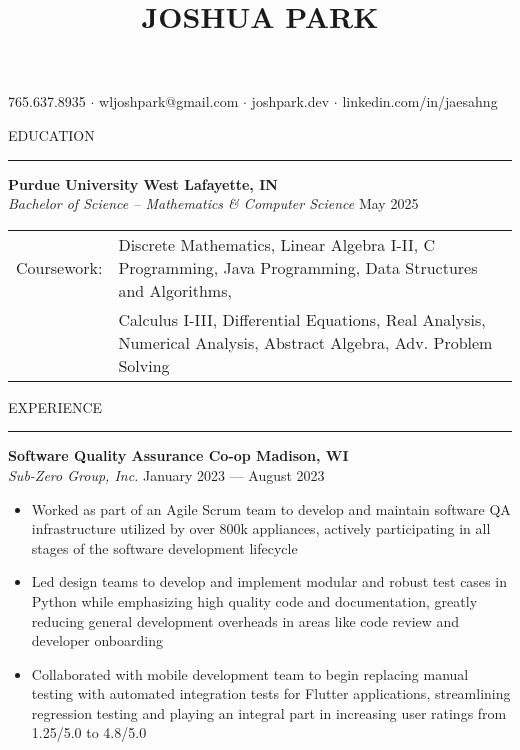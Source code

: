 \documentclass[letter,11pt]{article}
\begin{document}
\title{\Huge{JOSHUA PARK}}
\date{}
\maketitle
\vspace*{-6em}

\begin{center}\begin{small}
    765.637.8935 $\cdot$ wljoshpark@gmail.com $\cdot$ joshpark.dev $\cdot$ linkedin.com/in/jaesahng
\end{small}\end{center}

EDUCATION

\vspace*{-1.25em}
\rule{\textwidth}{1.2pt}
\textbf{Purdue University \hfill West Lafayette, IN}\\
\emph{Bachelor of Science -- Mathematics \& Computer Science} \hfill May 2025 \\
\begin{tabular}{@{}p{1.83cm}l}
    Coursework: & Discrete Mathematics, Linear Algebra I-II, C Programming, Java Programming, Data Structures and Algorithms,\\
    &Calculus I-III, Differential Equations, Real Analysis, Numerical Analysis, Abstract Algebra, Adv. Problem Solving
\end{tabular}

EXPERIENCE

\vspace*{-1.25em}
\rule{\textwidth}{1.2pt}
\textbf{Software Quality Assurance Co-op \hfill Madison, WI}\\
\emph{Sub-Zero Group, Inc.} \hfill January 2023 --- August 2023\\
\vspace*{-1.75em}
\begin{itemize}[label=-, leftmargin=*, align=left, noitemsep]
    \item Worked as part of an Agile Scrum team to develop and maintain software QA infrastructure utilized by over 800k appliances, actively participating in all stages of the software development lifecycle
    \item Led design teams to develop and implement modular and robust test cases in Python while emphasizing high quality code and documentation, greatly reducing general development overheads in areas like code review and developer onboarding
    \item Collaborated with mobile development team to begin replacing manual testing with automated integration tests for Flutter applications, streamlining regression testing and playing an integral part in increasing user ratings from 1.25/5.0 to 4.8/5.0
\end{itemize}
\vspace*{-0.25em}
\end{document}
